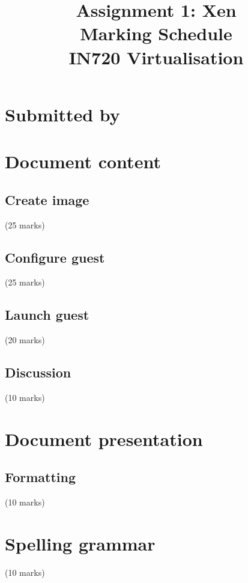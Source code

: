 \documentclass{article}
\begin{document}
\title{Assignment 1: Xen \\ Marking Schedule\\IN720 Virtualisation}
\date{}
\maketitle

\section*{Submitted by}

 \vspace{20mm}
 
\section{Document content}

\subsection{Create image}
 (25 marks)
 
 \vspace{30mm}

\subsection{Configure guest}
 (25 marks)
 
 \vspace{30mm}
 
\subsection{Launch guest}
 (20 marks)
 
 \vspace{30mm}
 
\subsection{Discussion}
 (10 marks)
 
 \vspace{30mm}
 
\section{Document presentation}

\subsection{Formatting}
 (10 marks)
 
 \vspace{20mm}
 
\section{Spelling grammar}
 (10 marks)
 
\end{document}
